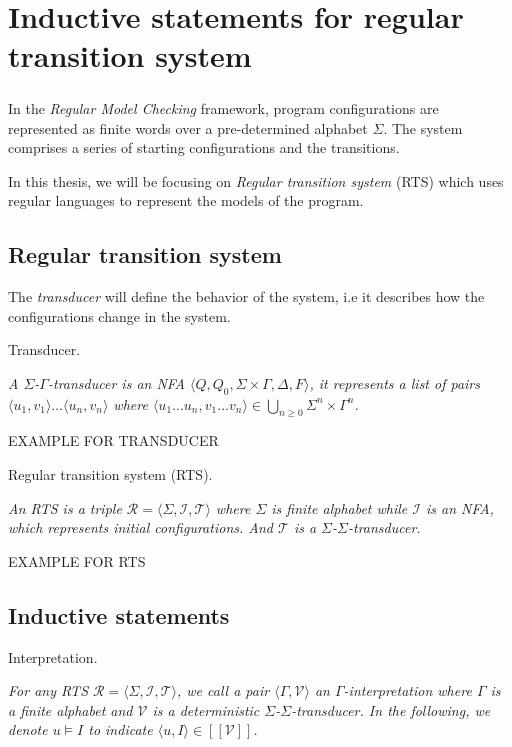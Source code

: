 \chapter{Inductive statements for regular transition system}\label{chapter:inductive_statement}
\paragraph*{}
In the \textit{Regular Model Checking} framework, program configurations are 
represented as finite words over a pre-determined alphabet $\Sigma$.
The system comprises a series of starting configurations and the transitions.

In this thesis, we will be focusing on \textit{Regular transition system} (RTS) 
which uses regular languages to represent the models of the program.
\section{Regular transition system}\label{section:rts}
The \textit{transducer} will define the behavior of the system, i.e 
it describes how the configurations change in the system.
\begin{definition}\label{definition:transducer}
    Transducer.
\end{definition}
\textit{
    A $\Sigma$-$\Gamma$-\textit{transducer} is an \textit{NFA} 
    $\langle Q, Q_0, \Sigma \times \Gamma, \Delta, F \rangle$,
    it represents a list of pairs $\langle u_1, v_1 \rangle \dots \langle u_n, v_n \rangle$
    where $\langle u_1 \dots u_n, v_1 \dots v_n \rangle \in \bigcup_{n \geq 0} \Sigma^{n} \times \Gamma^{n}$.
}

EXAMPLE FOR TRANSDUCER
\begin{definition}\label{definition:rts}
    Regular transition system (RTS).
\end{definition}
\textit{
   An RTS is a triple $\mathcal{R} = \langle \Sigma, \mathcal{I}, \mathcal{T} \rangle$ where $\Sigma$
   is finite alphabet while $\mathcal{I}$ is an NFA, which represents initial configurations.
   And $\mathcal{T}$ is a $\Sigma$-$\Sigma$-\textit{transducer}.
}

EXAMPLE FOR RTS

\section{Inductive statements}\label{section:inductive_statements}

\begin{definition}\label{definition:interpretation}
    Interpretation.
\end{definition}
\textit{
   For any RTS $\mathcal{R} = \langle \Sigma, \mathcal{I}, \mathcal{T} \rangle$, we call 
   a pair $\langle \Gamma, \mathcal{V} \rangle$ an $\Gamma$-\textit{interpretation}
   where $\Gamma$ is a finite alphabet and $\mathcal{V}$ is a deterministic $\Sigma$-$\Sigma$-\textit{transducer}.
   In the following, we denote $ u \models I $ to indicate $ \langle u, I \rangle \in [[\mathcal{V}]]$.
}

